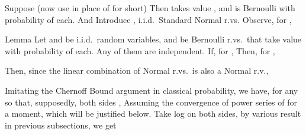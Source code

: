 Suppose (now use  in place of  for short)
Then  takes value , and is Bernoulli with probability  of each.
And
Introduce , i.i.d.\ Standard Normal r.vs.
Observe, for ,

\Result
{Lemma}
{
Let  and  be i.i.d.\ random variables,
and  be Bernoulli r.vs.\ that take value  with probability  of each.
Any of them are independent.
If, for ,
Then, for ,
}

Then, since the linear combination of Normal r.vs.\ is also a Normal r.v.,

\stopsubsection

\startsubsection [title={Using Chernoff Bound}]

Imitating the Chernoff Bound argument in classical probability, we have, for any  so that, supposedly, both sides \m {< \infty},
Assuming the convergence of power series of  for a moment, which will be justified below.
Take log on both sides, by various result in previous subsections, we get




